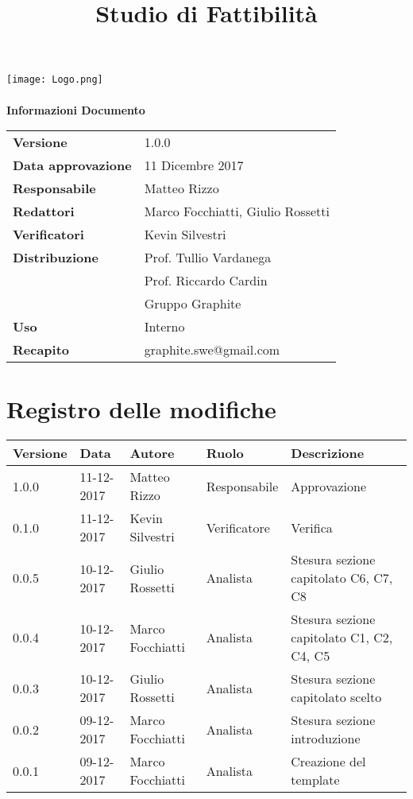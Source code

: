 \documentclass[openany,12pt,a4paper]{report}
\title{Studio di Fattibilità}
\author{}
\newcommand{\versione}{1.0.0}
\begin{document}
	\makeatletter
	\begin{titlepage}
		\setlength{\headsep}{0pt}
		\begin{center}
			\texttt{[image: Logo.png]}\\[1em]
			{\huge \bfseries  \@title }\\[10ex]
			\textbf{\Large Informazioni Documento} \\[2em]
			\bgroup
			\def\arraystretch{1.5}
			\begin{tabular}{l|l}
				\textbf{Versione} & \versione{} \\
				\textbf{Data approvazione} & 11 Dicembre 2017 \\
				\textbf{Responsabile} & Matteo Rizzo \\
				\textbf{Redattori} & Marco Focchiatti, Giulio Rossetti \\
				\textbf{Verificatori} & Kevin Silvestri \\
				\textbf{Distribuzione} & Prof. Tullio Vardanega \\
				& Prof. Riccardo Cardin \\
				& Gruppo Graphite \\
				\textbf{Uso} & Interno \\
				\textbf{Recapito} & graphite.swe@gmail.com \\
			\end{tabular}
			\egroup
		\end{center}
	\end{titlepage}
	\makeatother

	\thispagestyle{empty}
	\newpage
	
	
	\chapter*{Registro delle modifiche}
	\setlength\LTleft{-22mm}
	\begin{longtable}{|p{20mm}|p{20mm}|p{40mm}|p{30mm}|p{50mm}|}
		\hline
		\textbf{Versione} & \textbf{Data} & \textbf{Autore} & \textbf{Ruolo} & \textbf{Descrizione} \\ \hline 
			1.0.0 & 11-12-2017 & Matteo Rizzo & Responsabile & Approvazione\\ \hline
			0.1.0 & 11-12-2017 & Kevin Silvestri & Verificatore & Verifica\\ \hline
			0.0.5 & 10-12-2017 & Giulio Rossetti & Analista & Stesura sezione
			capitolato C6, C7, C8\\ \hline
			0.0.4 & 10-12-2017 & Marco Focchiatti & Analista & Stesura sezione
			capitolato C1, C2, C4, C5\\ \hline
			0.0.3 & 10-12-2017 & Giulio Rossetti & Analista & Stesura sezione capitolato scelto\\ \hline
			0.0.2 & 09-12-2017 & Marco Focchiatti & Analista & Stesura sezione introduzione\\ \hline
			0.0.1 & 09-12-2017 & Marco Focchiatti & Analista & Creazione del template\\ \hline	
		\end{longtable}
\end{document}
